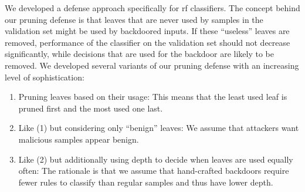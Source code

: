 \documentclass[9pt,sigconf,letterpaper,dvipsnames\ifx\removeHeaders\tempYes ,nonacm\fi]{acmart}
\begin{document}
We developed a defense approach specifically for \gls{rf} classifiers.
The concept behind our pruning defense is that leaves that are never used by samples in the validation set might be used by backdoored inputs. If these ``useless'' leaves are removed, performance of the classifier on the validation set should not decrease
significantly,
while decisions that are used for the backdoor are likely to be removed.
We developed several variants of our pruning defense with an increasing level of sophistication:
\begin{enumerate}[wide, labelwidth=!, labelindent=0pt]
\item Pruning leaves based on their usage: This means that the least used leaf is pruned first and the most used one last.
\item Like (1) but considering only ``benign'' leaves: We assume that attackers want malicious samples appear benign.
\item Like (2) but additionally using depth to decide when
leaves are used equally often: The rationale is that we assume that hand-crafted backdoors require fewer rules to classify than regular samples and thus have lower depth.
\end{enumerate}
\end{document}
